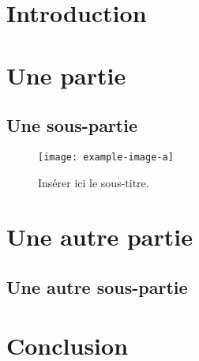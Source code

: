 \documentclass[a4paper,12pt,french]{article}
\begin{document}
\thispagestyle{empty}
\tableofcontents


\section{Introduction}


\newpage
\section{Une partie}

\subsection{Une sous-partie}

\lipsum[1]

\begin{figure}[ht!]
    \centering
    \texttt{[image: example-image-a]}
    \caption{Insérer ici le sous-titre.}
    \label{fig:id-de-la-figure}
\end{figure}




\section{Une autre partie}

\subsection{Une autre sous-partie}
\lipsum[2]


\section{Conclusion}

\lipsum[1]


\newpage
\thispagestyle{empty}
\end{document}

